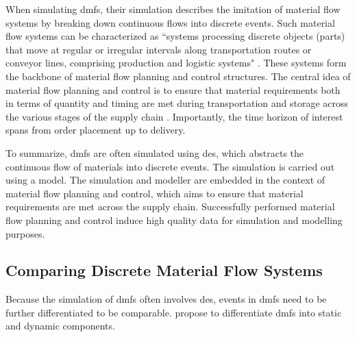 When simulating \gls{dmfs}, their simulation describes the imitation of material flow systems by breaking down continuous flows into discrete events. Such material flow systems can be characterized as ``systems processing discrete objects (parts) that move at regular or irregular intervals along transportation routes or conveyor lines, comprising production and logistic systems" \autocite{Arnold2006,Schwede2024}. These systems form the backbone of material flow planning and control structures. The central idea of material flow planning and control is to ensure that material requirements \textemdash both in terms of quantity and timing \textemdash are met during transportation and storage across the various stages of the supply chain \autocite{Gehr2007}. Importantly, the time horizon of interest spans from order placement up to delivery.

To summarize, \gls{dmfs} are often simulated using \gls{des}, which abstracts the continuous flow of materials into discrete events. The simulation is carried out using a model. The simulation and modeller are embedded in the context of material flow planning and control, which aims to ensure that material requirements are met across the supply chain. Successfully performed material flow planning and control induce high quality data for simulation and modelling purposes.

\subsection{Comparing Discrete Material Flow Systems}
\label{sec:comparing-dmfs}
Because the simulation of \gls{dmfs} often involves \gls{des}, events in \gls{dmfs} need to be further differentiated to be comparable. \Textcite{Arnold2006} propose to differentiate \gls{dmfs} into static and dynamic components.

